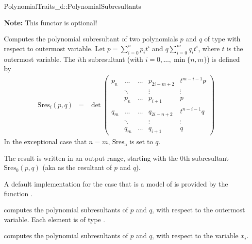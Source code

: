 \begin{ccRefConcept}{PolynomialTraits_d::PolynomialSubresultants}

\textbf{Note:} This functor is optional!

\ccDefinition

Computes the polynomial subresultant of two polynomials $p$ and $q$ of 
type  with respect to outermost variable.
Let $p=\sum_{i=0}^n p_i t^i$ and $q\sum_{i=0}^m q_i t^i$, where $t$
is the outermost variable.
The $i$th subresultant (with $i=0,\ldots,\min\{n,m\}$) is defined by
\begin{eqnarray*}
\mathrm{Sres}_i(p,q)&=&\det \left(\begin{array}{cccccc}
p_n & \ldots &\ldots& p_{2i-m+2}&t^{m-i-1}p \\
&\ddots&&\vdots&\vdots\\
&p_n&\ldots&p_{i+1}&p\\
q_m & \ldots &\ldots & q_{2i-n+2}&t^{n-i-1}q \\
&\ddots&&\vdots&\vdots\\
&q_m&\ldots&q_{i+1}&q
\end{array}\right)
\end{eqnarray*}
In the exceptional case that $n=m$, $\mathrm{Sres_n}$ is set to $q$.

The result is written in an output range, starting with the $0$th subresultant
$\mathrm{Sres}_0(p,q)$
(aka as the resultant of $p$ and $q$).

A default implementation for the case that 
is a model of 
is provided by the function .

\ccOperations
{}
         { computes the polynomial subresultants of $p$ and $q$, 
           with respect to the outermost variable. Each element is of type
           .}

         { computes the polynomial subresultants of $p$ and $q$, 
           with respect to the variable $x_i$.}


\ccSeeAlso

\\
\\
\\

\end{ccRefConcept}
